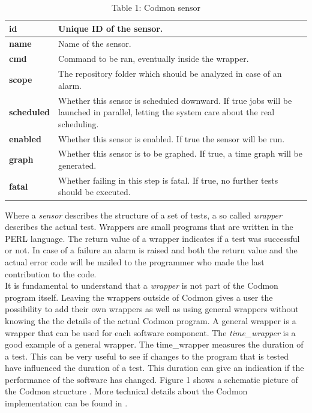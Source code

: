\documentclass{article}
\begin{document}
\begin{table}[h]
\centering
  \begin{tabular}{ | l| p{5cm} |}
  \hline
  \textbf{id} & Unique ID of the sensor. \\ \hline
  \textbf{name} & Name of the sensor. \\ \hline
  \textbf{cmd} & Command to be ran, eventually inside the wrapper. \\ \hline
  \textbf{scope} & The repository folder which should be analyzed in case of an alarm. \\ \hline
  \textbf{scheduled} & Whether this sensor is scheduled downward. If true jobs will be launched in parallel, letting the system care about the real scheduling. \\ \hline
  \textbf{enabled} & Whether this sensor is enabled. If true the sensor will be run. \\ \hline
  \textbf{graph} & Whether this sensor is to be graphed. If true, a time graph will be generated. \\ \hline
  \textbf{fatal} & Whether failing in this step is fatal. If true, no further tests should be executed.\\ \hline
  \end{tabular}
\caption{Table 1: Codmon sensor}
\label{tab:codsensor}
\end{table}


\noindent Where a \emph{sensor} describes the structure of a set of tests, a so called \emph{wrapper} describes the actual test. Wrappers are small programs that are written in the PERL
language. The return value of a wrapper indicates if a test was successful or not. In case of a failure an alarm is raised and both the return value and the actual error code will be mailed to
the programmer who made the last contribution to the code.\\

\noindent It is fundamental to understand that a \emph{wrapper} is not part of the Codmon program itself. Leaving the wrappers outside of Codmon gives a user the possibility to add their own 
wrappers as well as using general wrappers without knowing the the details of the actual Codmon program. A general wrapper is a wrapper that can be used for each software component. The 
\emph{time\_wrapper} is a good example of a general wrapper. The time\_wrapper measures the duration of a test. This can be very useful to see if changes to the program that is tested have influenced the 
duration of a test. This duration can give an indication if the performance of the software has changed. Figure 1 shows a schematic picture of the Codmon structure \cite{Codmon}. More technical details 
about the Codmon implementation can be found in \cite{Codmon}.\\
\end{document}
